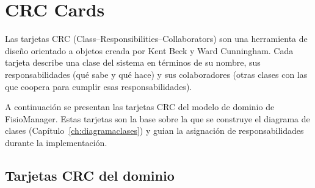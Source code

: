 
\chapter{CRC Cards}

Las tarjetas CRC (Class--Responsibilities--Collaborators) son una herramienta de diseño orientado a objetos creada por Kent Beck y Ward Cunningham. Cada tarjeta describe una clase del sistema en términos de su nombre, sus responsabilidades (qué sabe y qué hace) y sus colaboradores (otras clases con las que coopera para cumplir esas responsabilidades).

A continuación se presentan las tarjetas CRC del modelo de dominio de FisioManager. Estas tarjetas son la base sobre la que se construye el diagrama de clases (Capítulo~\ref{ch:diagramaclases}) y guian la asignación de responsabilidades durante la implementación.

\section{Tarjetas CRC del dominio}

\newcommand{\CRC}[3]{%
  \begin{crccard}{#1}
    \begin{minipage}[t]{0.48\textwidth}
      \centering\textbf{\color{fmAccent}\small RESPONSABILIDADES}\\[4pt]
      \raggedright\small
      #2
    \end{minipage}\hfill
    \begin{minipage}[t]{0.48\textwidth}
      \centering\textbf{\color{fmAccent}\small COLABORADORES}\\[4pt]
      \raggedright\small
      #3
    \end{minipage}
  \end{crccard}
}


